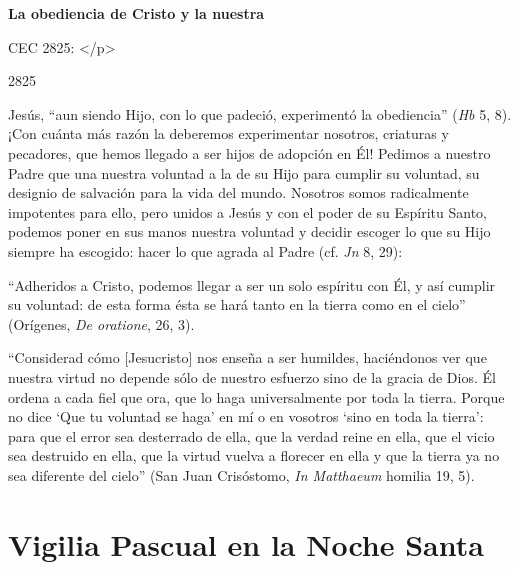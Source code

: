 			\begin{ccetheme}\textbf{La obediencia de Cristo y la nuestra }\end{ccetheme}
			
			\begin{ccereference}\end{ccereference}CEC 2825: </p>
			
			\begin{ccebody}\begin{ccenumber}2825\end{ccenumber} Jesús, “aun siendo Hijo, con lo que padeció, experimentó la obediencia” (\textit{Hb} 5, 8). ¡Con cuánta más razón la deberemos experimentar nosotros, criaturas y pecadores, que hemos llegado a ser hijos de adopción en Él! Pedimos a nuestro Padre que una nuestra voluntad a la de su Hijo para cumplir su voluntad, su designio de salvación para la vida del mundo. Nosotros somos radicalmente impotentes para ello, pero unidos a Jesús y con el poder de su Espíritu Santo, podemos poner en sus manos nuestra voluntad y decidir escoger lo que su Hijo siempre ha escogido: hacer lo que agrada al Padre (cf. \textit{Jn} 8, 29):\end{ccebody}
			
			\begin{ccecite}“Adheridos a Cristo, podemos llegar a ser un solo espíritu con Él, y así cumplir su voluntad: de esta forma ésta se hará tanto en la tierra como en el cielo” (Orígenes, \textit{De oratione}, 26, 3).\end{ccecite}
			
			\begin{ccecite}“Considerad cómo [Jesucristo] nos enseña a ser humildes, haciéndonos ver que nuestra virtud no depende sólo de nuestro esfuerzo sino de la gracia de Dios. Él ordena a cada fiel que ora, que lo haga universalmente por toda la tierra. Porque no dice ‘Que tu voluntad se haga’ en mí o en vosotros ‘sino en toda la tierra’: para que el error sea desterrado de ella, que la verdad reine en ella, que el vicio sea destruido en ella, que la virtud vuelva a florecer en ella y que la tierra ya no sea diferente del cielo” (San Juan Crisóstomo, \textit{In Matthaeum} homilia 19, 5).\end{ccecite}
			
			\chapter{Vigilia Pascual en la Noche Santa}
			
